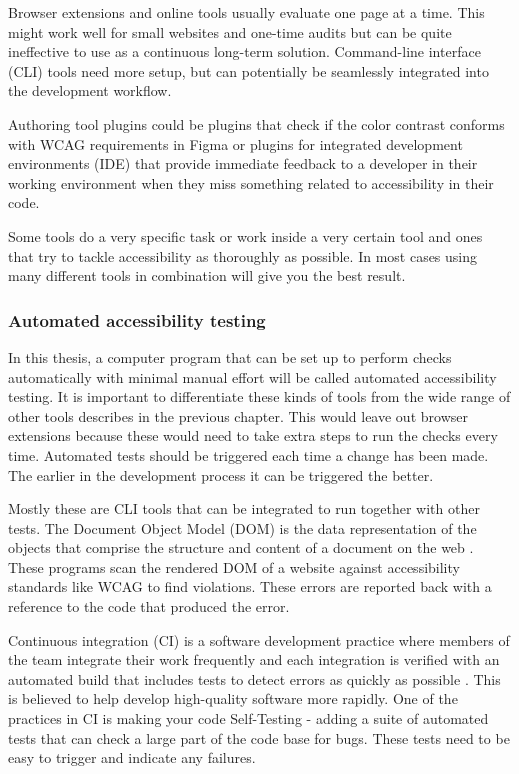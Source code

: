 \documentclass{master_thesis}
\begin{document}
Browser extensions and online tools usually evaluate one page at a time. This might work well for small websites and one-time audits but can be quite ineffective to use as a continuous long-term solution. Command-line interface (CLI) tools need more setup, but can potentially be seamlessly integrated into the development workflow.

Authoring tool plugins could be plugins that check if the color contrast conforms with WCAG requirements in Figma or plugins for integrated development environments (IDE) that provide immediate feedback to a developer in their working environment when they miss something related to accessibility in their code.

Some tools do a very specific task or work inside a very certain tool and ones that try to tackle accessibility as thoroughly as possible. In most cases using many different tools in combination will give you the best result.

\subsubsection{Automated accessibility testing}

In this thesis, a computer program that can be set up to perform checks automatically with minimal manual effort will be called automated accessibility testing. It is important to differentiate these kinds of tools from the wide range of other tools describes in the previous chapter. This would leave out browser extensions because these would need to take extra steps to run the checks every time. Automated tests should be triggered each time a change has been made. The earlier in the development process it can be triggered the better.

Mostly these are CLI tools that can be integrated to run together with other tests. The Document Object Model (DOM) is the data representation of the objects that comprise the structure and content of a document on the web \citep{MDN2023}. These programs scan the rendered DOM of a website against accessibility standards like WCAG to find violations. These errors are reported back with a reference to the code that produced the error.

Continuous integration (CI) is a software development practice where members of the team integrate their work frequently and each integration is verified with an automated build that includes tests to detect errors as quickly as possible \citep{Fowler2006}. This is believed to help develop high-quality software more rapidly. One of the practices in CI is making your code Self-Testing - adding a suite of automated tests that can check a large part of the code base for bugs. These tests need to be easy to trigger and indicate any failures.
\end{document}
